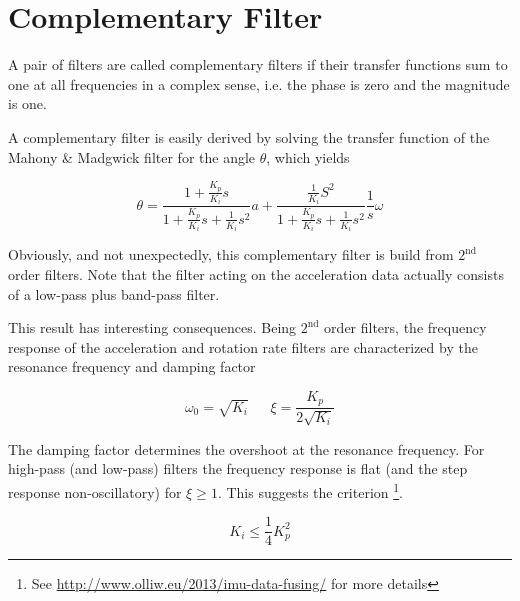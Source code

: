 \chapter{ Complementary Filter}
A pair of filters are called complementary filters if their transfer functions sum to one at all frequencies in a complex sense, i.e. the phase is zero and the magnitude is one.






A complementary filter is easily derived by solving the transfer function of the Mahony \& Madgwick filter for the angle $\theta$, which yields

\begin{equation}
\theta = {\frac{1 + \frac{K_p}{K_i}s}{1 + \frac{K_p}{K_i}s + \frac{1}{K_i}s^2}}a + {\frac{\frac{1}{K_i}S^2}{1+\frac{K_p}{K_i}s + \frac{1}{K_i}s^2}\frac{1}{s}\omega}
\end{equation}

Obviously, and not unexpectedly, this complementary filter is build from $2^{\mathrm{nd}}$ order filters. Note that the filter acting on the acceleration data actually consists of a low-pass plus band-pass filter.

This result has interesting consequences. Being $2^{\mathrm{nd}}$ order filters, the frequency response of the acceleration and rotation rate filters are characterized by the resonance frequency and damping factor

\begin{equation}
\omega_0 = \sqrt{K_i}~~~~~~~ \xi = \frac{K_p}{2\sqrt{K_i}}
\end{equation}

The damping factor determines the overshoot at the resonance frequency. For high-pass (and low-pass) filters the frequency response is flat (and the step response non-oscillatory) for $\xi \geq 1$. This suggests the criterion \footnote{See \url{http://www.olliw.eu/2013/imu-data-fusing/} for more details}.

\begin{equation}
K_i \leq \frac{1}{4}K_p^2
\end{equation}